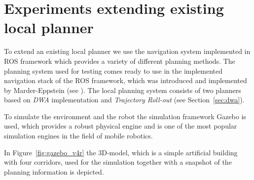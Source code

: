 \section{Experiments extending existing local planner}
To extend an existing local planner we use the navigation system implemented in ROS framework which provides a variety of different planning methods. 
The planning system used for testing comes ready to use in the implemented navigation stack of the ROS framework, which was introduced and implemented by Marder-Eppstein (see \cite{DBLP:conf/icra/Marder-EppsteinBFGK10}).
The local planning system consists of two planners based on \emph{DWA} implementation and \emph{Trajectory Roll-out} (see Section~\ref{sec:dwa}).

To simulate the environment and the robot the simulation framework Gazebo is used, which provides a robust physical engine and is one of the most popular simulation engines in the field of mobile robotics. 

In Figure~\ref{fig:gazebo_v4r} the 3D-model, which is a simple artificial building with four corridors, used for the simulation together with a snapshot of the planning information is depicted.

